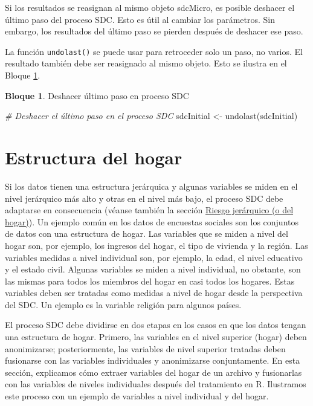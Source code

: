 \documentclass[
]{book}
\newenvironment{Shaded}{\begin{snugshade}}{\end{snugshade}}
\newcommand{\CommentTok}[1]{\textcolor[rgb]{0.56,0.35,0.01}{\textit{#1}}}
\newcommand{\FunctionTok}[1]{\textcolor[rgb]{0.00,0.00,0.00}{#1}}
\newcommand{\NormalTok}[1]{#1}
\newcommand{\OtherTok}[1]{\textcolor[rgb]{0.56,0.35,0.01}{#1}}
\theoremstyle{definition}
\theoremstyle{definition}
\newtheorem{example}{Bloque}[chapter]
\theoremstyle{definition}
\theoremstyle{definition}
\theoremstyle{remark}
\begin{document}
Si los resultados se reasignan al mismo objeto sdcMicro, es posible deshacer el último paso del proceso SDC. Esto es útil al cambiar los parámetros. Sin embargo, los resultados del último paso se pierden después de deshacer ese paso.

La función \texttt{undolast()} se puede usar para retroceder solo un paso, no varios. El resultado también debe ser reasignado al mismo objeto. Esto se ilustra en el Bloque \ref{exm:bloqueMicro11}.

\begin{example}
\protect\hypertarget{exm:bloqueMicro11}{}\label{exm:bloqueMicro11}Deshacer último paso en proceso SDC
\end{example}

\begin{Shaded}
\begin{Highlighting}[]
\CommentTok{\# Deshacer el último paso en el proceso SDC}
\NormalTok{sdcInitial }\OtherTok{\textless{}{-}} \FunctionTok{undolast}\NormalTok{(sdcInitial)}
\end{Highlighting}
\end{Shaded}

\hypertarget{estructura-del-hogar}{%
\section{Estructura del hogar}\label{estructura-del-hogar}}

Si los datos tienen una estructura jerárquica y algunas variables se miden en el nivel jerárquico más alto y otras en el nivel más bajo, el proceso SDC debe adaptarse en consecuencia (véanse también la sección \protect\hyperlink{riesgo-jeruxe1rquico-o-del-hogar}{Riesgo jerárquico (o del hogar)}). Un ejemplo común en los datos de encuestas sociales son los conjuntos de datos con una estructura de hogar. Las variables que se miden a nivel del hogar son, por ejemplo, los ingresos del hogar, el tipo de vivienda y la región. Las variables medidas a nivel individual son, por ejemplo, la edad, el nivel educativo y el estado civil. Algunas variables se miden a nivel individual, no obstante, son las mismas para todos los miembros del hogar en casi todos los hogares. Estas variables deben ser tratadas como medidas a nivel de hogar desde la perspectiva del SDC. Un ejemplo es la variable religión para algunos países.

El proceso SDC debe dividirse en dos etapas en los casos en que los datos tengan una estructura de hogar. Primero, las variables en el nivel superior (hogar) deben anonimizarse; posteriormente, las variables de nivel superior tratadas deben fusionarse con las variables individuales y anonimizarse conjuntamente. En esta sección, explicamos cómo extraer variables del hogar de un archivo y fusionarlas con las variables de niveles individuales después del tratamiento en R. Ilustramos este proceso con un ejemplo de variables a nivel individual y del hogar.
\end{document}

